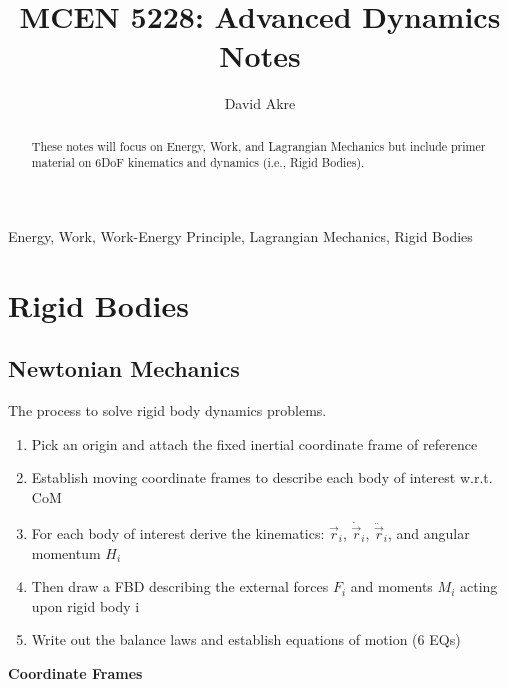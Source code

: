 \documentclass[conference]{IEEEtran}
\begin{document}
\title{MCEN 5228: Advanced Dynamics Notes}

\author{David Akre}

\maketitle

\begin{abstract}
These notes will focus on Energy, Work, and Lagrangian Mechanics but include primer material on 6DoF kinematics and dynamics (i.e., Rigid Bodies).
\end{abstract}

\begin{IEEEkeywords}
    Energy, Work, Work-Energy Principle, Lagrangian Mechanics, Rigid Bodies
\end{IEEEkeywords}

\section{Rigid Bodies}
\subsection{Newtonian Mechanics}
The process to solve rigid body dynamics problems.
\begin{enumerate}
    \item Pick an origin and attach the fixed inertial coordinate frame of reference
    \item Establish moving coordinate frames to describe each body of interest w.r.t. CoM
    \item For each body of interest derive the kinematics: $\vec{r}_i$, $\dot{\vec{r}}_i$, $\ddot{\vec{r}}_i$, and angular momentum $H_i$
    \item Then draw a FBD describing the external forces $F_i$ and moments $M_i$ acting upon rigid body i
    \item Write out the balance laws and establish equations of motion (6 EQs)
\end{enumerate}

\textbf{Coordinate Frames}
\end{document}
